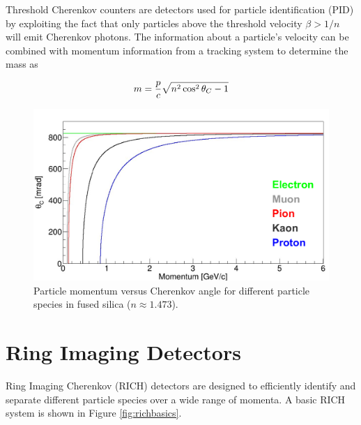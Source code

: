 Threshold Cherenkov counters are detectors used for particle identification (PID) by exploiting the fact that only particles above the threshold velocity $\beta > 1/n$ will emit Cherenkov photons. The information about a particle's velocity can be combined with momentum information from a tracking system to determine the mass as \cite{ParticleDetectionHandbook}

\begin{equation}
	m = \frac{p}{c} \sqrt{n^2 \cos^2\theta_{C} - 1}
	\label{eq:mass}
\end{equation}

\begin{figure}[ht]
	\centering
	\includegraphics[scale=.8]{figures/angle_seperation_6.pdf}
	\caption{Particle momentum versus Cherenkov angle for different particle species in fused silica ($n \approx 1.473$).}
	\label{fig:angleseperation}
\end{figure}

\section{Ring Imaging Detectors}
Ring Imaging Cherenkov (RICH) detectors are designed to efficiently identify and separate different particle species over a wide range of momenta. A basic RICH system is shown in Figure \ref{fig:richbasics}. 


